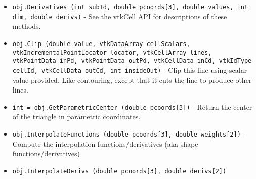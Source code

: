 \begin{itemize}
\item  \verb|obj.Derivatives (int subId, double pcoords[3], double values, int dim, double derivs)| -  See the vtkCell API for descriptions of these methods.

\item  \verb|obj.Clip (double value, vtkDataArray cellScalars, vtkIncrementalPointLocator locator, vtkCellArray lines, vtkPointData inPd, vtkPointData outPd, vtkCellData inCd, vtkIdType cellId, vtkCellData outCd, int insideOut)| -  Clip this line using scalar value provided. Like contouring, except
 that it cuts the line to produce other lines.

\item  \verb|int = obj.GetParametricCenter (double pcoords[3])| -  Return the center of the triangle in parametric coordinates.

\item  \verb|obj.InterpolateFunctions (double pcoords[3], double weights[2])| -  Compute the interpolation functions/derivatives
 (aka shape functions/derivatives)

\item  \verb|obj.InterpolateDerivs (double pcoords[3], double derivs[2])|

\end{itemize}
